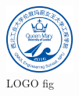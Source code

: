 \begin{figure}[ht]
    \centering
    \includegraphics[width=0.2\textwidth]{./figure/LOGO.jpg}
    \caption{LOGO fig}
\end{figure}